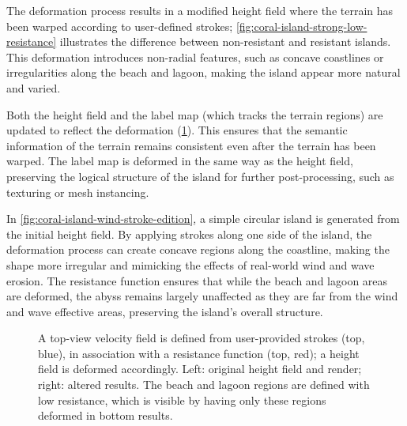 The deformation process results in a modified height field where the terrain has been warped according to user-defined strokes; \cref{fig:coral-island-strong-low-resistance} illustrates the difference between non-resistant and resistant islands. This deformation introduces non-radial features, such as concave coastlines or irregularities along the beach and lagoon, making the island appear more natural and varied.

Both the height field and the label map (which tracks the terrain regions) are updated to reflect the deformation (\cref{fig:coral-island-wind-effect-result}). This ensures that the semantic information of the terrain remains consistent even after the terrain has been warped. The label map is deformed in the same way as the height field, preserving the logical structure of the island for further post-processing, such as texturing or mesh instancing.

In \cref{fig:coral-island-wind-stroke-edition}, a simple circular island is generated from the initial height field. By applying strokes along one side of the island, the deformation process can create concave regions along the coastline, making the shape more irregular and mimicking the effects of real-world wind and wave erosion. The resistance function ensures that while the beach and lagoon areas are deformed, the abyss remains largely unaffected as they are far from the wind and wave effective areas, preserving the island's overall structure.

\begin{figure}
    \caption[Island deformation on specific regions using resistance function]{A top-view velocity field is defined from user-provided strokes (top, blue), in association with a resistance function (top, red); a height field is deformed accordingly. Left: original height field and render; right: altered results. The beach and lagoon regions are defined with low resistance, which is visible by having only these regions deformed in bottom results.}
    \label{fig:coral-island-wind-effect-result}
\end{figure}



